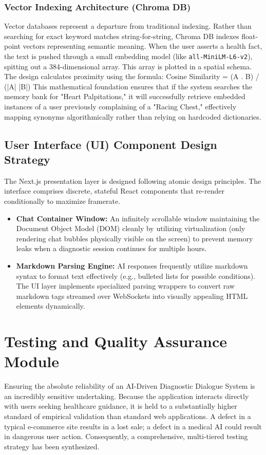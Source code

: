 \documentclass[12pt]{article}
\begin{document}
\subsubsection{Vector Indexing Architecture (Chroma DB)}
Vector databases represent a departure from traditional indexing. Rather than searching for exact keyword matches string-for-string, Chroma DB indexes float-point vectors representing semantic meaning. When the user asserts a health fact, the text is pushed through a small embedding model (like \texttt{all-MiniLM-L6-v2}), spitting out a 384-dimensional array. This array is plotted in a spatial schema. The design calculates proximity using the formula:
Cosine Similarity = (A . B) / (|A| |B|)
This mathematical foundation ensures that if the system searches the memory bank for "Heart Palpitations," it will successfully retrieve embedded instances of a user previously complaining of a "Racing Chest," effectively mapping synonyms algorithmically rather than relying on hardcoded dictionaries.

\subsection{User Interface (UI) Component Design Strategy}
The Next.js presentation layer is designed following atomic design principles. The interface comprises discrete, stateful React components that re-render conditionally to maximize framerate.
\begin{itemize}
    \item \textbf{Chat Container Window:} An infinitely scrollable window maintaining the Document Object Model (DOM) cleanly by utilizing virtualization (only rendering chat bubbles physically visible on the screen) to prevent memory leaks when a diagnostic session continues for multiple hours.
    \item \textbf{Markdown Parsing Engine:} AI responses frequently utilize markdown syntax to format text effectively (e.g., bulleted lists for possible conditions). The UI layer implements specialized parsing wrappers to convert raw markdown tags streamed over WebSockets into visually appealing HTML elements dynamically.
\end{itemize}

\newpage
\section{Testing and Quality Assurance Module}

Ensuring the absolute reliability of an AI-Driven Diagnostic Dialogue System is an incredibly sensitive undertaking. Because the application interacts directly with users seeking healthcare guidance, it is held to a substantially higher standard of empirical validation than standard web applications. A defect in a typical e-commerce site results in a lost sale; a defect in a medical AI could result in dangerous user action. Consequently, a comprehensive, multi-tiered testing strategy has been synthesized.
\end{document}
